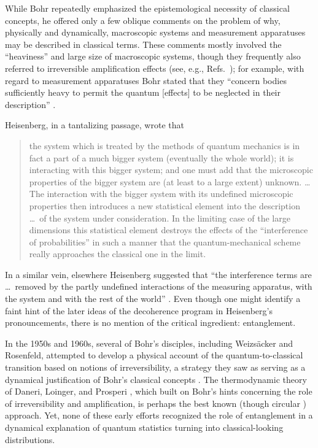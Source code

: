 \documentclass[3p,sort&compress]{elsarticle}
\begin{document}
While Bohr repeatedly emphasized the epistemological necessity of classical concepts, he offered only a few oblique comments on the problem of why, physically and dynamically, macroscopic systems and measurement apparatuses may be described in classical terms. These comments mostly involved the ``heaviness'' and large size of macroscopic systems, though they frequently also referred to irreversible amplification effects (see, e.g., Refs.~\cite{Bohr:1958:lu,Bohr:1958:mj}); for example, with regard to measurement apparatuses Bohr stated that they ``concern bodies sufficiently heavy to permit the quantum [effects] to be neglected in their description'' \cite[p.~170]{Bohr:1958:lu}.

Heisenberg, in a tantalizing passage, wrote that \cite[pp.~121--2]{Heisenberg:1989:zb}
%
\begin{quote}
  the system which is treated by the methods of quantum mechanics is in fact a part of a much bigger system (eventually the whole world); it is interacting with
  this bigger system; and one must add that the microscopic properties of the bigger system are (at least to a large extent) unknown. \dots The interaction with the bigger system with its undefined microscopic properties then introduces a new statistical element into the description \dots\ of the system under
  consideration. In the limiting case of the large dimensions this statistical element destroys the effects of the ``interference of probabilities'' in such a manner that the quantum-mechanical scheme really approaches the classical one in the limit.
\end{quote}
%
In a similar vein, elsewhere Heisenberg suggested that ``the interference terms are \dots\ removed by the partly undefined interactions of the measuring apparatus, with the system and with the rest of the world'' \cite[p.~23]{Heisenberg:1955:lm}. Even though one might identify a faint hint of the later ideas of the decoherence program in Heisenberg's pronouncements, there is no mention of the critical ingredient: entanglement. 

In the 1950s and 1960s, several of Bohr's disciples, including Weizs\"acker and Rosenfeld, attempted to develop a physical account of the quantum-to-classical transition based on notions of irreversibility, a strategy they saw as serving as a dynamical justification of Bohr's classical concepts \cite{Camilleri:2015:oo}. The thermodynamic theory of Daneri, Loinger, and Prosperi \cite{Daneri:1962:om}, which built on Bohr's hints concerning the role of irreversibility and amplification, is perhaps the best known (though circular \cite{Wigner:1995:jm, Bub:1971:ll}) approach. Yet, none of these early efforts recognized the role of entanglement in a dynamical explanation of quantum statistics turning into classical-looking distributions.
\end{document}
